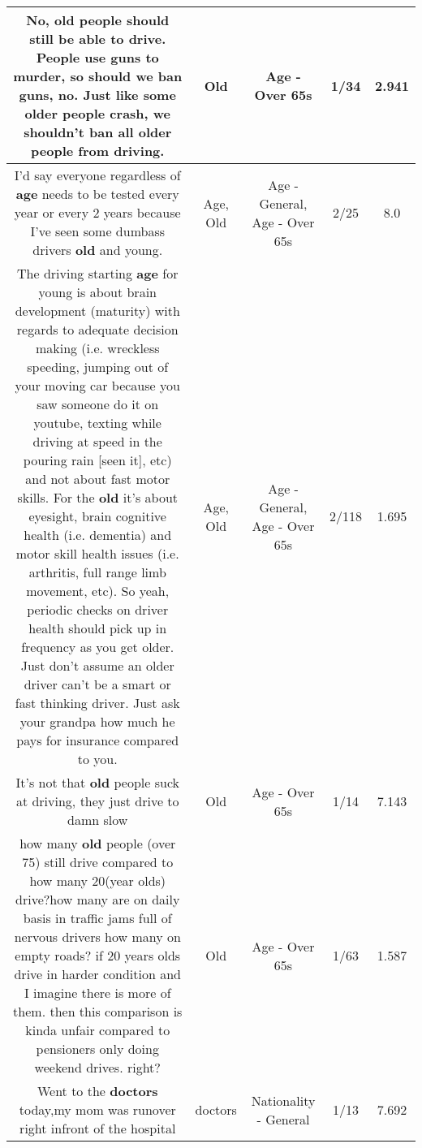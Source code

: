 \documentclass[11pt]{article}
\newlength\mylength
\begin{document}
\begin{center}
\begin{longtable}{|C{.65\mylength}|C{.30\mylength}|C{.12\mylength}|C{.12\mylength}|C{.12\mylength}|}
  \small No, \textbf{old} people should still be able to drive. People use guns to murder, so should we ban guns, no. Just like some older people crash, we shouldn't ban all older people from driving.\normalsize   & Old & Age - Over 65s & 1/34 & 2.941 \\  \hline
  \small I'd say everyone regardless of \textbf{age} needs to be tested every year or every 2 years because I've seen some dumbass drivers \textbf{old} and young.\normalsize   & Age, Old & Age - General, Age - Over 65s & 2/25 & 8.0 \\  \hline
  \small The driving starting \textbf{age} for young is about brain development (maturity) with regards to adequate decision making (i.e. wreckless speeding, jumping out of your moving car because you saw someone do it on youtube, texting while driving at speed in the pouring rain [seen it], etc) and not about fast motor skills. For the \textbf{old} it's about eyesight, brain cognitive health (i.e. dementia) and motor skill health issues (i.e. arthritis, full range limb movement, etc). So yeah, periodic checks on driver health should pick up in frequency as you get older. Just don't assume an older driver can't be a smart or fast thinking driver. Just ask your grandpa how much he pays for insurance compared to you.\normalsize   & Age, Old & Age - General, Age - Over 65s & 2/118 & 1.695 \\  \hline
  \small It's not that \textbf{old} people suck at driving, they just drive to damn slow\normalsize   & Old & Age - Over 65s & 1/14 & 7.143 \\  \hline
  \small how many \textbf{old} people (over 75) still drive compared to how many 20(year olds) drive?how many are on daily basis in traffic jams full of nervous drivers how many on empty roads? if 20 years olds drive in harder condition and I imagine there is more of them. then this comparison is kinda unfair compared to pensioners only doing weekend drives.  right?\normalsize   & Old & Age - Over 65s & 1/63 & 1.587 \\  \hline
  \small Went to the \textbf{doctors} today,my mom was runover right infront of the hospital\normalsize   & doctors & Nationality - General & 1/13 & 7.692 \\  \hline

\end{longtable}
\end{center}
\end{document}

